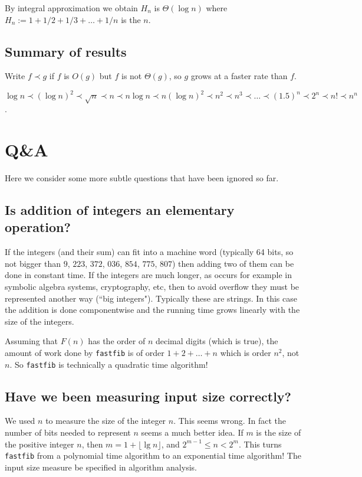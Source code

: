 \begin{Boxample} 
By integral approximation we obtain $H_n $ is $\Theta(\log n)$ where 
$H_n:=1+ 1/2 + 1/3 + \dots + 1/n$ is the $n$. 
\end{Boxample}

\section{Summary of results}
Write $f \prec g$ if $f$ is $O(g)$ but $f$ is not $\Theta(g)$, so $g$ grows at a  faster rate than $f$. 
\begin{Boxample}
$\log n \prec (\log n)^2 \prec \sqrt{n} \prec n \prec n \log n 
 \prec n (\log n)^2 \prec n^2 
\prec n^3 \prec \dots \prec (1.5)^n \prec 2^n \prec n! \prec n^n$.
\end{Boxample}


\chapter{Q\&A} %
Here we consider some more subtle questions that have been ignored so far.

\section{Is addition of integers an elementary operation?}
If the integers (and their sum) can fit into a machine word (typically 64 bits, so not bigger than $9$, $223$, $372$, $036$, $854$, $775$, $807$) then 
adding two of them can be done in constant time. 
If the integers are much longer, as occurs for example in symbolic algebra systems, cryptography, etc, 
then to avoid overflow they must be represented another way (``big integers"). Typically these are strings. 
In this case the addition is done componentwise and the running time grows linearly with the size of the integers. 

\begin{Boxample}
Assuming that $F(n)$ has the order of $n$ decimal digits (which is true), the amount of work 
done by \texttt{fastfib} is of order $1+2+\dots + n$ which is order $n^2$, not $n$. 
So \texttt{fastfib} is technically a quadratic time algorithm!
\end{Boxample}

\section{Have we been measuring input size correctly?}
We used $n$ to measure the size of the integer $n$. This seems wrong. 
In fact the number of bits needed to represent $n$ seems a much better idea. 
If $m$ is the size of the positive integer $n$, then $m = 1+\lfloor\lg n\rfloor$, and $2^{m-1} \leq n < 2^m$.
This turns \texttt{fastfib} from a polynomial time algorithm to an exponential time algorithm! 
The input size measure  be specified in algorithm analysis.

